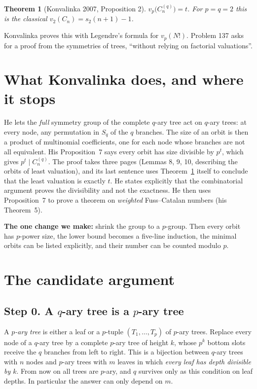 \documentclass[11pt]{article}
\newtheorem{theorem}{Theorem}
\theoremstyle{definition}
\newcommand{\vp}{v_p}
\newcommand{\C}[1]{C^{(q)}_{#1}}
\begin{document}
\begin{theorem}[Konvalinka 2007, Proposition 2]\label{thm:main}
$\vp\bigl(\C{n}\bigr)=t$. For $p=q=2$ this is the classical $v_2(C_n)=s_2(n+1)-1$.
\end{theorem}

Konvalinka proves this with Legendre's formula for $\vp(N!)$. Problem 137 asks for a proof
from the symmetries of trees, ``without relying on factorial valuations''.

\section{What Konvalinka does, and where it stops}

He lets the \emph{full} symmetry group of the complete $q$-ary tree act on $q$-ary trees:
at every node, any permutation in $S_q$ of the $q$ branches. The size of an orbit is then a
product of multinomial coefficients, one for each node whose branches are not all equivalent.
His Proposition~7 says every orbit has size divisible by $p^t$, which gives
$p^t\mid \C{n}$. The proof takes three pages (Lemmas 8, 9, 10, describing the orbits of least
valuation), and its last sentence uses Theorem~\ref{thm:main} itself to conclude that the
least valuation is exactly $t$. He states explicitly that the combinatorial argument proves
the divisibility and not the exactness. He then uses Proposition~7 to prove a theorem on
\emph{weighted} Fuss--Catalan numbers (his Theorem~5).

\textbf{The one change we make:} shrink the group to a $p$-group. Then every orbit has
$p$-power size, the lower bound becomes a five-line induction, the minimal orbits can be
listed explicitly, and their number can be counted modulo $p$.

\section{The candidate argument}\label{sec:argument}

\subsection*{Step 0. A $q$-ary tree is a $p$-ary tree}

A \emph{$p$-ary tree} is either a leaf or a $p$-tuple $(T_1,\dots,T_p)$ of $p$-ary trees.
Replace every node of a $q$-ary tree by a complete $p$-ary tree of height $k$, whose $p^k$
bottom slots receive the $q$ branches from left to right. This is a bijection between
$q$-ary trees with $n$ nodes and $p$-ary trees with $m$ leaves in which \emph{every leaf has
depth divisible by $k$}. From now on all trees are $p$-ary, and $q$ survives only as this
condition on leaf depths. In particular the answer can only depend on $m$.
\end{document}
